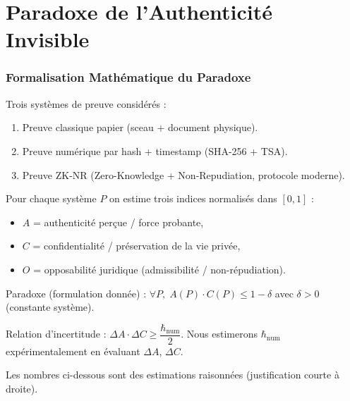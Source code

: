 \documentclass[12pt,a4paper]{article}
\begin{document}
	 \part*{Paradoxe de l'Authenticité Invisible}
	 \section{Formalisation Mathématique du Paradoxe}
	  Trois systèmes de preuve considérés :
	  
	  \begin{enumerate}
	  	\item Preuve classique papier (sceau + document physique).
	  	\item Preuve numérique par hash + timestamp (SHA-256 + TSA).
	  	\item Preuve ZK-NR (Zero-Knowledge + Non-Repudiation, protocole moderne).
	  \end{enumerate}
	  
	  Pour chaque système $P$ on estime trois indices normalisés dans $[0,1]$ :
	  
	  \begin{itemize}
	  	\item $A$ = authenticité perçue / force probante,
	  	\item $C$ = confidentialité / préservation de la vie privée,
	  	\item $O$ = opposabilité juridique (admissibilité / non-répudiation).
	  \end{itemize}
	  
	  Paradoxe (formulation donnée) : $\forall P,\; A(P) \cdot C(P) \leq 1 - \delta$ avec $\delta > 0$ (constante système).
	  
	  Relation d'incertitude : $\Delta A \cdot \Delta C \geq \dfrac{\hbar_{\text{num}}}{2}$. Nous estimerons $\hbar_{\text{num}}$ expérimentalement en évaluant $\Delta A$, $\Delta C$.
	  
	  Les nombres ci-dessous sont des estimations raisonnées (justification courte à droite).
	  
\end{document}
